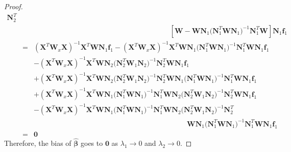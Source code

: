\documentclass[review]{elsarticle}
\begin{document}
\begin{proof}
\begin{eqnarray*}
\boldsymbol N_2^T \\
&& \hspace{8cm}
\left[\boldsymbol W 
-
\boldsymbol W \boldsymbol N_1 
(\boldsymbol N_1^T  \boldsymbol W \boldsymbol N_1 \boldsymbol)^{-1} 
\boldsymbol N_1^T  \boldsymbol W \right]
\boldsymbol N_{1} \boldsymbol f_1 \\
&=& 
(\boldsymbol X^T  \boldsymbol W_x \boldsymbol X )^{-1} \boldsymbol X^T 
\boldsymbol W \boldsymbol N_{1} \boldsymbol f_1
-
(\boldsymbol X^T  \boldsymbol W_x \boldsymbol X )^{-1} \boldsymbol X^T 
\boldsymbol W \boldsymbol N_1 
(\boldsymbol N_1^T  \boldsymbol W \boldsymbol N_1 \boldsymbol)^{-1} 
\boldsymbol N_1^T  \boldsymbol W  \boldsymbol N_{1} \boldsymbol f_1 \\
&&
-
(\boldsymbol X^T  \boldsymbol W_x \boldsymbol X )^{-1} \boldsymbol X^T 
\boldsymbol W \boldsymbol N_2 
(\boldsymbol N_2^T  \boldsymbol W_1 \boldsymbol N_2 \boldsymbol )^{-1} 
\boldsymbol N_2^T \boldsymbol W \boldsymbol N_{1} \boldsymbol f_1 \\
&&
+
(\boldsymbol X^T  \boldsymbol W_x \boldsymbol X )^{-1} \boldsymbol X^T 
\boldsymbol W
\boldsymbol N_2 
(\boldsymbol N_2^T  \boldsymbol W_1 \boldsymbol N_2 \boldsymbol )^{-1} 
\boldsymbol N_2^T
\boldsymbol W \boldsymbol N_1 
(\boldsymbol N_1^T  \boldsymbol W \boldsymbol N_1 \boldsymbol)^{-1} 
\boldsymbol N_1^T  \boldsymbol W
\boldsymbol N_{1} \boldsymbol f_1 \\
&&
+
(\boldsymbol X^T  \boldsymbol W_x \boldsymbol X )^{-1} \boldsymbol X^T 
\boldsymbol W \boldsymbol N_1 
(\boldsymbol N_1^T  \boldsymbol W \boldsymbol N_1 \boldsymbol)^{-1} 
\boldsymbol N_1^T  \boldsymbol W \boldsymbol N_2 
(\boldsymbol N_2^T  \boldsymbol W_1 \boldsymbol N_2 \boldsymbol )^{-1} 
\boldsymbol N_2^T  \boldsymbol W \boldsymbol N_{1} \boldsymbol f_1  \\
&& 
- 
(\boldsymbol X^T  \boldsymbol W_x \boldsymbol X )^{-1} \boldsymbol X^T 
\boldsymbol W \boldsymbol N_1 
(\boldsymbol N_1^T  \boldsymbol W \boldsymbol N_1 \boldsymbol)^{-1} 
\boldsymbol N_1^T  \boldsymbol W \boldsymbol N_2 
(\boldsymbol N_2^T  \boldsymbol W_1 \boldsymbol N_2 \boldsymbol )^{-1} 
\boldsymbol N_2^T \\ 
&& \hspace{9cm}
\boldsymbol W \boldsymbol N_1 
(\boldsymbol N_1^T  \boldsymbol W \boldsymbol N_1 \boldsymbol)^{-1} 
\boldsymbol N_1^T  \boldsymbol W
\boldsymbol N_{1} \boldsymbol f_1 \\
&= &
\bm 0
\end{eqnarray*}
Therefore, the bias of $\bm {\hat \beta}$ goes to $\bm 0$ as $\lambda_1 \to 0$ and $\lambda_2 \to 0$. 


\end{proof}
\end{document}
